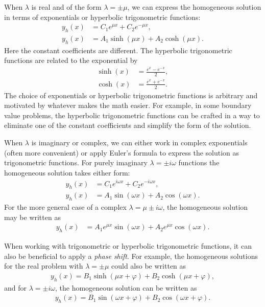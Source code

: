 When $\lambda$ is real and of the form $\lambda = \pm \mu$, we can express the homogeneous solution in terms of exponentials or hyperbolic trigonometric functions:
\begin{align}
  y_h(x) &= C_1 e^{\mu x} + C_2 e^{-\mu x}, \\ \nonumber
  y_h(x) &= A_1 \sinh (\mu x) + A_2 \cosh ( \mu x ). \nonumber 
\end{align}
Here the constant coefficients are different. The hyperbolic trigonometric functions are related to the exponential by
\begin{subequations}
\begin{align}
  \sinh(x) &= \frac{ e^x - e^{-x} }{ 2 }, \\
  \cosh(x) &= \frac{ e^x + e^{-x} }{ 2 }.
\end{align}
\end{subequations}
The choice of exponentials or hyperbolic trigonometric functions is arbitrary and motivated by whatever makes the math easier. For example, in some boundary value problems, the hyperbolic trigonometric functions can be crafted in a way to eliminate one of the constant coefficients and simplify the form of the solution.

When $\lambda$ is imaginary or complex, we can either work in complex exponentials (often more convenient) or apply Euler's formula to express the solution as trigonometric functions. For purely imaginary $\lambda = \pm i \omega$ functions the homogeneous solution takes either form:
\begin{align}
  y_h(x) &= C_1 e^{i \omega x} + C_2 e^{-i \omega x}, \\ \nonumber
  y_h(x) &= A_1 \sin (\omega x) + A_2 \cos ( \omega x ). \nonumber 
\end{align}
For the more general case of a complex $\lambda = \mu \pm i \omega$, the homogeneous solution may be written as
\begin{align}
  y_h(x) &= A_1 e^{\mu x} \sin (\omega x) + A_2 e^{\mu x} \cos ( \omega x ). \nonumber 
\end{align}

When working with trigonometric or hyperbolic trigonometric functions, it can also be beneficial to apply a \emph{phase shift}. For example, the homogeneous solutions for the real problem with $\lambda = \pm \mu$ could also be written as
\begin{align}
  y_h(x) = B_1 \sinh( \mu x + \varphi )  + B_2 \cosh( \mu x + \varphi ) , \nonumber
\end{align}
and for $\lambda = \pm i \omega$, the homogeneous solution can be written as
\begin{align}
  y_h(x) = B_1 \sin( \omega x + \varphi ) + B_2 \cos( \omega x + \varphi ) . \nonumber
\end{align}

